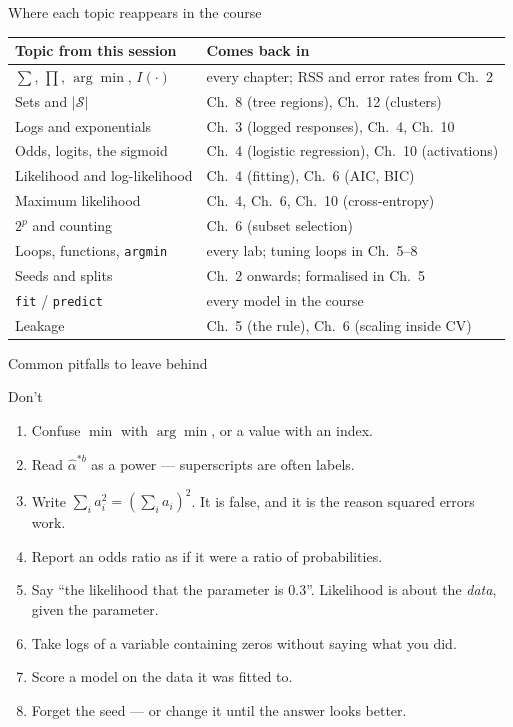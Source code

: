 \documentclass[aspectratio=169,11pt]{beamer}
\begin{document}
\begin{frame}{Where each topic reappears in the course}
  \footnotesize
  \begin{center}
  \begin{tabular}{@{}ll@{}}
    \toprule
    \textbf{Topic from this session} & \textbf{Comes back in} \\
    \midrule
    $\sum$, $\prod$, $\arg\min$, $I(\cdot)$ & every chapter; RSS and error rates from Ch.\ 2 \\
    Sets and $|\mathcal{S}|$ & Ch.\ 8 (tree regions), Ch.\ 12 (clusters) \\
    Logs and exponentials & Ch.\ 3 (logged responses), Ch.\ 4, Ch.\ 10 \\
    Odds, logits, the sigmoid & Ch.\ 4 (logistic regression), Ch.\ 10 (activations) \\
    Likelihood and log-likelihood & Ch.\ 4 (fitting), Ch.\ 6 (AIC, BIC) \\
    Maximum likelihood & Ch.\ 4, Ch.\ 6, Ch.\ 10 (cross-entropy) \\
    $2^p$ and counting & Ch.\ 6 (subset selection) \\
    Loops, functions, \texttt{argmin} & every lab; tuning loops in Ch.\ 5--8 \\
    Seeds and splits & Ch.\ 2 onwards; formalised in Ch.\ 5 \\
    \texttt{fit} / \texttt{predict} & every model in the course \\
    Leakage & Ch.\ 5 (the rule), Ch.\ 6 (scaling inside CV) \\
    \bottomrule
  \end{tabular}
  \end{center}
\end{frame}

\begin{frame}{Common pitfalls to leave behind}
  \begin{alertblock}{Don't}
    \begin{enumerate}
      \item Confuse $\min$ with $\arg\min$, or a value with an index.
      \item Read $\hat\alpha^{*b}$ as a power --- superscripts are often labels.
      \item Write $\sum_i a_i^2 = (\sum_i a_i)^2$. It is false, and it is the
            reason squared errors work.
      \item Report an odds ratio as if it were a ratio of probabilities.
      \item Say ``the likelihood that the parameter is $0.3$''. Likelihood is
            about the \emph{data}, given the parameter.
      \item Take logs of a variable containing zeros without saying what you did.
      \item Score a model on the data it was fitted to.
      \item Forget the seed --- or change it until the answer looks better.
    \end{enumerate}
  \end{alertblock}
\end{frame}
\end{document}
